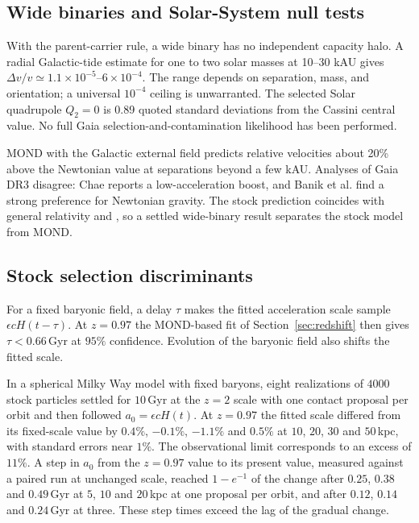 \subsection{Wide binaries and Solar-System null tests}
\label{sec:binaries}
With the parent-carrier rule, a wide binary has no independent capacity
halo. A radial Galactic-tide estimate for one to two solar masses at
10--30 kAU gives $\Delta v/v\simeq1.1\times10^{-5}$--$6\times10^{-4}$.
The range depends on separation, mass, and orientation; a universal
$10^{-4}$ ceiling is unwarranted. The selected Solar quadrupole
$Q_2=0$ is 0.89 quoted standard deviations from the Cassini central
value. No full Gaia selection-and-contamination likelihood has been
performed. 

MOND with the Galactic external field predicts relative velocities about
20\% above the Newtonian value at separations beyond a few kAU. Analyses
of Gaia DR3 disagree: Chae reports a low-acceleration boost, and Banik et
al. find a strong preference for Newtonian gravity. The stock prediction coincides with general relativity
and \LCDM, so a settled wide-binary result separates the stock model from
MOND. \cite{chae23,banik24}

\subsection{Stock selection discriminants}
\label{sec:stocklags}
For a fixed baryonic field, a delay $\tau$ makes the fitted acceleration
scale sample $\epsilon cH(t-\tau)$. At $z=0.97$ the MOND-based fit of
Section~\ref{sec:redshift} then gives $\tau<0.66\,$Gyr at $95\%$
confidence. Evolution of the baryonic field also shifts the fitted scale.
\cite{ciocan} 

In a spherical Milky Way model with fixed baryons, eight realizations of
$4000$ stock particles settled for $10\,$Gyr at the $z=2$ scale with one
contact proposal per orbit and then followed $a_0=\epsilon cH(t)$. At
$z=0.97$ the fitted scale differed from its fixed-scale value by $0.4\%$,
$-0.1\%$, $-1.1\%$ and $0.5\%$ at $10$, $20$, $30$ and $50\,$kpc, with
standard errors near $1\%$. The observational limit corresponds to an
excess of $11\%$. A step in $a_0$ from the $z=0.97$ value to its present
value, measured against a paired run at unchanged scale, reached
$1-e^{-1}$ of the change after $0.25$, $0.38$ and $0.49\,$Gyr at $5$,
$10$ and $20\,$kpc at one proposal per orbit, and after $0.12$, $0.14$
and $0.24\,$Gyr at three. These step times exceed the lag of the gradual
change. 

